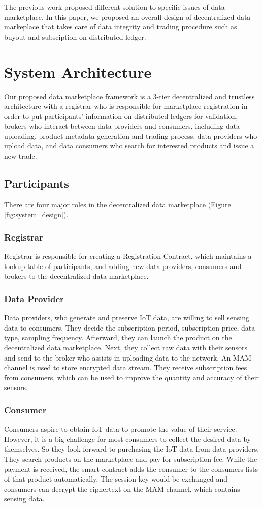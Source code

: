 \documentclass[journal,a4paper]{IEEEtran}
\begin{document}
The previous work proposed different solution to specific issues of data marketplace. In this paper, we proposed an  overall design of decentralized data markeplace that takes care of data integrity and trading procedure such as buyout and subsciption on distributed ledger.

\section{System Architecture}
Our proposed data marketplace framework is a 3-tier decentralized and trustless architecture with a registrar who is responsible for marketplace registration in order to put participants' information on distributed ledgers for validation, brokers who interact between data providers and consumers, including data uploading, product metadata generation and trading process, data providers who upload data, and data consumers who search for interested products and issue a new trade.

\subsection{Participants}
There are four major roles in the decentralized data marketplace (Figure \ref{fig:system_design}).

\subsubsection{Registrar}
Registrar is responsible for creating a Registration Contract, which maintains a lookup table of participants, and adding new data providers, consumers and brokers to the decentralized data marketplace.

\subsubsection{Data Provider}
Data providers, who generate and preserve IoT data, are willing to sell sensing data to consumers. They decide the subscription period, subscription price, data type, sampling frequency. Afterward, they can launch the product on the decentralized data marketplace. Next, they collect raw data with their sensors and send to the broker who assists in uploading data to the network. An MAM channel\cite{MAM} is used to store encrypted data stream. They receive subscription fees from consumers, which can be used to improve the quantity and accuracy of their sensors.

\subsubsection{Consumer}
Consumers aspire to obtain IoT data to promote the value of their service. However, it is a big challenge for most consumers to collect the desired data by themselves. So they look forward to purchasing the IoT data from data providers. They search products on the marketplace and pay for subscription fee. While the payment is received, the smart contract adds the consumer to the consumers lists of that product automatically. The session key would be exchanged and consumers can decrypt the ciphertext on the MAM channel, which contains sensing data.
\end{document}
